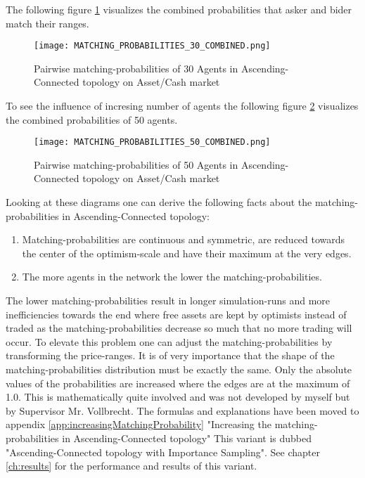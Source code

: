 \documentclass[Bachelorarbeit.tex]{subfiles}
\begin{document}
The following figure \ref{fig:MATCHING_PROBABILITIES_30_COMBINED} visualizes the combined probabilities that asker and bider match their ranges.

\begin{figure}[H]
	\centering
  \texttt{[image: MATCHING\_PROBABILITIES\_30\_COMBINED.png]}
	\caption{Pairwise matching-probabilities of 30 Agents in Ascending-Connected topology on Asset/Cash market}
	\label{fig:MATCHING_PROBABILITIES_30_COMBINED}
\end{figure}

To see the influence of incresing number of agents the following figure \ref{fig:MATCHING_PROBABILITIES_50_COMBINED} visualizes the combined probabilities of 50 agents.

\begin{figure}[H]
	\centering
  \texttt{[image: MATCHING\_PROBABILITIES\_50\_COMBINED.png]}
	\caption{Pairwise matching-probabilities of 50 Agents in Ascending-Connected topology on Asset/Cash market}
	\label{fig:MATCHING_PROBABILITIES_50_COMBINED}
\end{figure}

Looking at these diagrams one can derive the following facts about the matching-probabilities in Ascending-Connected topology:
\begin{enumerate}
\item Matching-probabilities are continuous and symmetric, are reduced towards the center of the optimism-scale and have their maximum at the very edges.
\item The more agents in the network the lower the matching-probabilities.
\end{enumerate}

The lower matching-probabilities result in longer simulation-runs and more inefficiencies towards the end where free assets are kept by optimists instead of traded as the matching-probabilities decrease so much that no more trading will occur. To elevate this problem one can adjust the matching-probabilities by transforming the price-ranges. It is of very importance that the shape of the matching-probabilities distribution must be exactly the same. Only the absolute values of the probabilities are increased where the edges are at the maximum of 1.0. This is mathematically quite involved and was not developed by myself but by Supervisor Mr. Vollbrecht. The formulas and explanations have been moved to appendix \ref{app:increasingMatchingProbability} "Increasing the matching-probabilities in Ascending-Connected topology"
\medskip
This variant is dubbed "Ascending-Connected topology with Importance Sampling". See chapter \ref{ch:results} for the performance and results of this variant.
\end{document}
